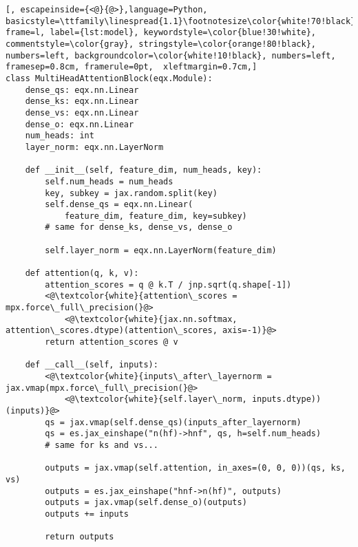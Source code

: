 \documentclass[10pt, a4paper, logo, onecolumn, internal, copyright]{dsme}
\newcommand{\mpx}{\textsc{MPX}}
\begin{document}
\begin{example}[h]
    \centering
    \begin{minipage}{0.95\linewidth}
            \caption{Implementation of model updates via Equinox and \mpx{}. \mpx{} is designed such that its model update routine closely resembles the one of Equinox.}
            \label{ex:model}
        \begin{mdframed}[
    backgroundcolor=white!10!black,
    leftmargin=0.5cm,hidealllines=true,%
  innerleftmargin=0.2cm,innerrightmargin=0.2cm,innertopmargin=0cm,innerbottommargin=-0.10cm
]
            \begin{lstlisting}[, escapeinside={<@}{@>},language=Python, basicstyle=\ttfamily\linespread{1.1}\footnotesize\color{white!70!black}, frame=l, label={lst:model}, keywordstyle=\color{blue!30!white}, commentstyle=\color{gray}, stringstyle=\color{orange!80!black}, numbers=left, backgroundcolor=\color{white!10!black}, numbers=left, framesep=0.8cm, framerule=0pt,  xleftmargin=0.7cm,]
class MultiHeadAttentionBlock(eqx.Module):
    dense_qs: eqx.nn.Linear
    dense_ks: eqx.nn.Linear
    dense_vs: eqx.nn.Linear
    dense_o: eqx.nn.Linear
    num_heads: int
    layer_norm: eqx.nn.LayerNorm

    def __init__(self, feature_dim, num_heads, key):
        self.num_heads = num_heads
        key, subkey = jax.random.split(key)
        self.dense_qs = eqx.nn.Linear(
            feature_dim, feature_dim, key=subkey)
        # same for dense_ks, dense_vs, dense_o

        self.layer_norm = eqx.nn.LayerNorm(feature_dim)

    def attention(q, k, v):
        attention_scores = q @ k.T / jnp.sqrt(q.shape[-1])
        <@\textcolor{white}{attention\_scores = mpx.force\_full\_precision(}@>
            <@\textcolor{white}{jax.nn.softmax, attention\_scores.dtype)(attention\_scores, axis=-1)}@>
        return attention_scores @ v
    
    def __call__(self, inputs):
        <@\textcolor{white}{inputs\_after\_layernorm = jax.vmap(mpx.force\_full\_precision(}@>
            <@\textcolor{white}{self.layer\_norm, inputs.dtype))(inputs)}@>
        qs = jax.vmap(self.dense_qs)(inputs_after_layernorm)
        qs = es.jax_einshape("n(hf)->hnf", qs, h=self.num_heads)
        # same for ks and vs...

        outputs = jax.vmap(self.attention, in_axes=(0, 0, 0))(qs, ks, vs)
        outputs = es.jax_einshape("hnf->n(hf)", outputs)
        outputs = jax.vmap(self.dense_o)(outputs)
        outputs += inputs

        return outputs
        \end{lstlisting}
        \end{mdframed}
    \end{minipage}
\end{example}
\end{document}
